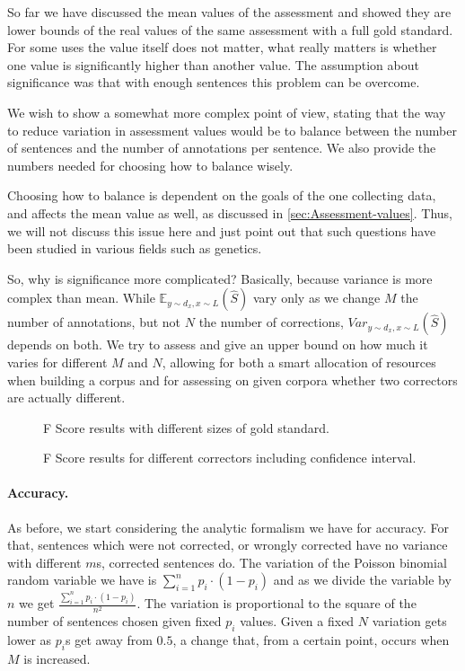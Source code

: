 \documentclass[english]{article}
\begin{document}
So far we have discussed the mean values of the assessment and showed they are lower bounds of the real values of the same assessment with a full gold standard. For some uses the value itself does not matter, what really matters is whether one value is significantly higher than another value. The assumption about significance was that with enough sentences this problem can be overcome.

We wish to show a somewhat more complex point of view, stating that the way to reduce variation in assessment values would be to balance between the number of sentences and the number of annotations per sentence. We also provide the numbers needed for choosing how to balance wisely. 

Choosing how to balance is dependent on the goals of the one collecting data, and affects the mean value as well, as discussed in \ref{sec:Assessment-values}. Thus, we will not discuss this issue here and just point out that such questions have been studied in various fields such as genetics\cite{ionita2010optimal}.

So, why is significance more complicated? Basically, because variance is more complex than mean. While $\mathbb{E}_{y\sim d_x, x\sim L}\left(\hat{S}\right)$ vary only as we change $M$
the number of annotations, but not $N$ the number of corrections,
$Var_{y\sim d_x, x\sim L}(\hat{S})$ depends on both. We try to assess and give an upper
bound on how much it varies for different $M$ and $N$, allowing
for both a smart allocation of resources when building a corpus and for assessing on given corpora whether two correctors are actually different.

\begin{figure}
	\caption{F Score results with different sizes of gold standard.}
	\label{tab:F_Ms}
\end{figure}
\begin{figure}
	\caption{F Score results for different correctors including confidence interval.}
	\label{fig:F_correctors}
\end{figure}


\paragraph{Accuracy.} As before, we start considering the analytic formalism we have for accuracy. For that, sentences which were not corrected, or wrongly corrected have no variance with different $m$s, corrected sentences do. The variation of the Poisson binomial random variable we have is $\sum_{i=1}^{n}p_i\cdot\left(1-p_i\right)$ and as we divide the variable by $n$ we get $\frac{\sum_{i=1}^{n}p_i\cdot\left(1-p_i\right)}{n^2}$. 
The variation is proportional to the square of the number of sentences chosen given fixed $p_i$ values. Given a fixed $N$ variation gets lower as $p_i$s get away from $0.5$, a change that, from a certain point, occurs when $M$ is increased.
\end{document}
